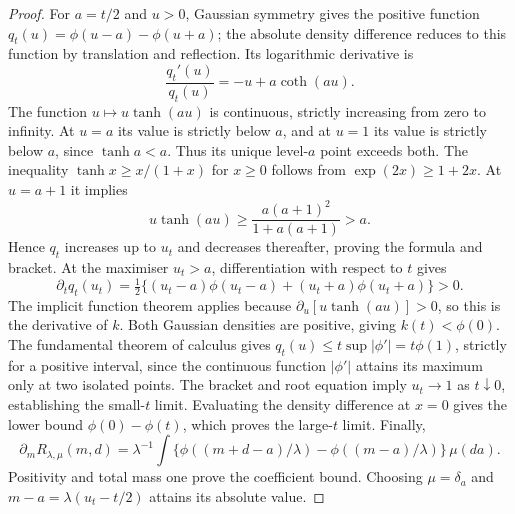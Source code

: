 \begin{proof}
For $a=t/2$ and $u>0$, Gaussian symmetry gives the positive function
$q_t(u)=\phi(u-a)-\phi(u+a)$; the absolute density difference reduces
to this function by translation and reflection. Its logarithmic
derivative is
\begin{equation}
 \frac{q_t'(u)}{q_t(u)}=-u+a\coth(au).
 \label{eq:sharp-k-log-derivative}
\end{equation}
The function $u\mapsto u\tanh(au)$ is continuous, strictly increasing
from zero to infinity. At $u=a$ its value is strictly below $a$, and at
$u=1$ its value is strictly below $a$, since $\tanh a<a$. Thus its
unique level-$a$ point exceeds both. The inequality
$\tanh x\geq x/(1+x)$ for $x\geq0$ follows from
$\exp(2x)\geq1+2x$. At $u=a+1$ it implies
\begin{equation}
 u\tanh(au)\geq
 \frac{a(a+1)^2}{1+a(a+1)}>a.
 \label{eq:sharp-k-upper-bracket}
\end{equation}
Hence $q_t$ increases up to $u_t$ and decreases thereafter, proving
the formula and bracket. At the maximiser $u_t>a$, differentiation
with respect to $t$ gives
\begin{equation}
 \partial_t q_t(u_t)=\tfrac12\{(u_t-a)\phi(u_t-a)
                              +(u_t+a)\phi(u_t+a)\}>0.
 \label{eq:sharp-k-monotonicity}
\end{equation}
The implicit function theorem applies because
$\partial_u[u\tanh(au)]>0$, so this is the derivative of $k$.
Both Gaussian densities are positive, giving $k(t)<\phi(0)$.
The fundamental theorem of calculus gives
$q_t(u)\leq t\sup|\phi'|=t\phi(1)$, strictly for a positive interval,
since the continuous function $|\phi'|$ attains its maximum only at
two isolated points. The bracket and root equation imply $u_t\to1$
as $t\downarrow0$, establishing the small-$t$ limit. Evaluating the
density difference at $x=0$ gives the lower bound
$\phi(0)-\phi(t)$, which proves the large-$t$ limit. Finally,
\begin{equation}
 \partial_m R_{\lambda,\mu}(m,d)=\lambda^{-1}
   \int\{\phi((m+d-a)/\lambda)-\phi((m-a)/\lambda)\}\,\mu(da).
 \label{eq:sharp-common-derivative-integral}
\end{equation}
Positivity and total mass one prove the coefficient bound. Choosing
$\mu=\delta_a$ and $m-a=\lambda(u_t-t/2)$ attains its absolute value.
\end{proof}


